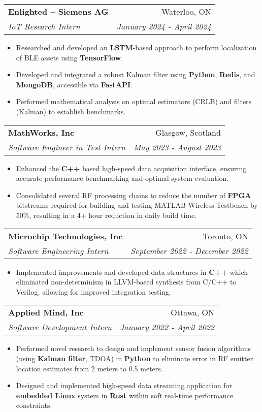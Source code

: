 \documentclass[letterpaper,11pt]{article}
\makeatletter
\newcommand{\resumeItem}[1]{
  \item\small{
    {#1 \vspace{-2pt}}
  }
}
\newcommand{\resumeSubheading}[4]{
  \vspace{-1pt}\item[]
  \begin{tabular*}{0.98\textwidth}{l@{\extracolsep{\fill}}r}
      \hspace{-10pt}\textbf{#1} & #2 \\
      \hspace{-10pt}\textit{\small#3} & \textit{\small #4} \\
    \end{tabular*}\vspace{-5pt}
}
\newcommand{\resumeItemListStart}{\begin{itemize}}
\newcommand{\resumeItemListEnd}{\end{itemize}\vspace{-5pt}}
\makeatother
\begin{document}
    \resumeSubheading
      {Enlighted -- Siemens AG}{Waterloo, ON}
      {IoT Research Intern}{January 2024 - April 2024}
    \resumeItemListStart
      \resumeItem{Researched and developed an \textbf{LSTM}-based approach to perform localization of BLE assets using \textbf{TensorFlow}.}
      \resumeItem{Developed and integrated a robust Kalman filter using \textbf{Python}, \textbf{Redis}, and \textbf{MongoDB}, accessible via \textbf{FastAPI}.}
      \resumeItem{Performed mathematical analysis on optimal estimators (CRLB) and filters (Kalman) to establish benchmarks.}
    \resumeItemListEnd
    \vspace{-10pt}

    \resumeSubheading
      {MathWorks, Inc}{Glasgow, Scotland}
      {Software Engineer in Test Intern}{May 2023 - August 2023}
      \resumeItemListStart
        \resumeItem{Enhanced the \textbf{C++} based high-speed data acquisition interface, ensuring accurate performance benchmarking and optimal system evaluation.}
        \resumeItem{Consolidated several RF processing chains to reduce the number of \textbf{FPGA} bitstreams required for building and testing MATLAB Wireless Testbench by 50\%, resulting in a 4+ hour reduction in daily build time.}

      \resumeItemListEnd
      \vspace{-5pt}
    \resumeSubheading
      {Microchip Technologies, Inc}{Toronto, ON}
      {Software Engineering Intern}{September 2022 - December 2022}
      \resumeItemListStart
        \resumeItem{Implemented improvements and developed data structures in \textbf{C++} which eliminated non-determinism in LLVM-based synthesis from C/C++ to Verilog, allowing for improved integration testing.}
      \resumeItemListEnd
      \vspace{-5pt}

    \resumeSubheading
      {Applied Mind, Inc}{Ottawa, ON}
      {Software Development Intern}{January 2022 - April 2022}
      \resumeItemListStart
      \resumeItem{Performed novel research to design and implement sensor fusion algorithms (using \textbf{Kalman filter}, TDOA) in \textbf{Python} to eliminate error in RF emitter location estimates from 2 meters to 0.5 meters.}
      \resumeItem{Designed and implemented high-speed data streaming application for \textbf{embedded Linux} system in \textbf{Rust} within soft real-time performance constraints.}
      \resumeItemListEnd
      \vspace{-5pt}
     
\end{document}
